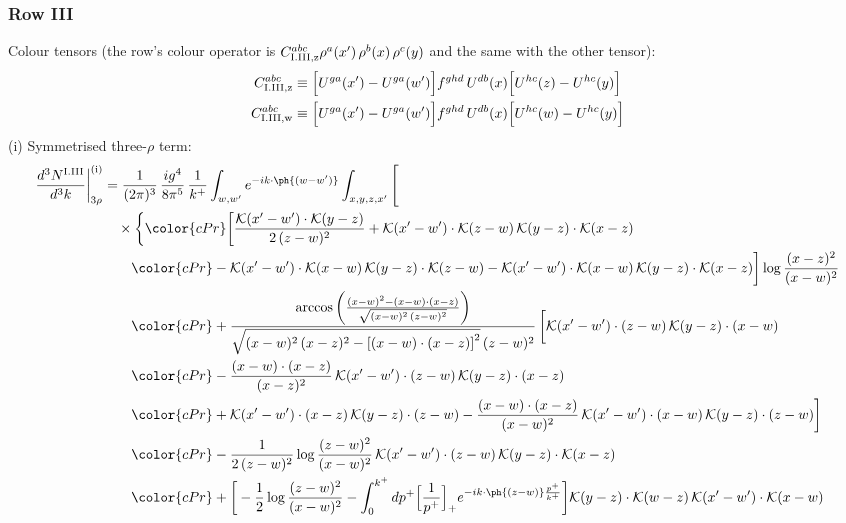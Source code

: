 \subsubsection*{Row III}
Colour tensors (the row's colour operator is $C^{abc}_{{\rm I.III,z}}\rho^{a}(x')\,\rho^{b}(x)\,\rho^{c}(y)$ and the same with the other tensor):
\begin{align}
C^{abc}_{{\rm I.III,z}}&\equiv \Big[U^{ga}(x')-U^{ga}(w')\Big]f^{ghd}\,U^{db}(x)\Big[U^{hc}(z)-U^{hc}(y)\Big]\notag\\
C^{abc}_{{\rm I.III,w}}&\equiv \Big[U^{ga}(x')-U^{ga}(w')\Big]f^{ghd}\,U^{db}(x)\Big[U^{hc}(w)-U^{hc}(y)\Big]\notag
\end{align}
(i) Symmetrised three-$\rho$ term:
\begin{align}
\frac{d^{3}N^{\rm I.III}}{d^{3}k}\bigg|^{\rm (i)}_{3\rho}&=\frac{1}{(2\pi)^{3}}\,\frac{ig^{4}}{8\pi^{5}}\,\frac{1}{k^{+}}\int_{w,w'}e^{-ik\cdot\ph{(w-w')}}\int_{x,y,z,x'}\Bigg[\notag\\
&\quad\times\bigg\{{\color{cPr}\bigg[\frac{\mathcal{K}(x'-w')\cdot\mathcal{K}(y-z)}{2\,(z-w)^{2}}+\mathcal{K}(x'-w')\cdot\mathcal{K}(z-w)\,\mathcal{K}(y-z)\cdot\mathcal{K}(x-z)}\notag\\
&\qquad{\color{cPr}-\mathcal{K}(x'-w')\cdot\mathcal{K}(x-w)\,\mathcal{K}(y-z)\cdot\mathcal{K}(z-w)-\mathcal{K}(x'-w')\cdot\mathcal{K}(x-w)\,\mathcal{K}(y-z)\cdot\mathcal{K}(x-z)\bigg]\log\frac{(x-z)^{2}}{(x-w)^{2}}}\notag\\
&\qquad{\color{cPr}+\frac{\arccos\left(\frac{(x-w)^{2}-(x-w)\cdot (x-z)}{\sqrt{(x-w)^{2}\,(z-w)^{2}}}\right)}{\sqrt{(x-w)^{2}\,(x-z)^{2}-\left[(x-w)\cdot (x-z)\right]^{2}}\,(z-w)^{2}}\,\bigg[\mathcal{K}(x'-w')\cdot(z-w)\,\mathcal{K}(y-z)\cdot(x-w)}\notag\\
&\qquad{\color{cPr}-\frac{(x-w)\cdot(x-z)}{(x-z)^{2}}\,\mathcal{K}(x'-w')\cdot(z-w)\,\mathcal{K}(y-z)\cdot(x-z)}\notag\\
&\qquad{\color{cPr}+\mathcal{K}(x'-w')\cdot(x-z)\,\mathcal{K}(y-z)\cdot(z-w)-\frac{(x-w)\cdot(x-z)}{(x-w)^{2}}\,\mathcal{K}(x'-w')\cdot(x-w)\,\mathcal{K}(y-z)\cdot(z-w)\bigg]}\notag\\
&\qquad{\color{cPr}-\frac{1}{2\,(z-w)^{2}}\log\frac{(z-w)^{2}}{(x-w)^{2}}\,\mathcal{K}(x'-w')\cdot(z-w)\,\mathcal{K}(y-z)\cdot\mathcal{K}(x-z)}\notag\\
&\qquad{\color{cPr}+\bigg[-\frac{1}{2}\log\frac{(z-w)^{2}}{(x-w)^{2}}-\int_{0}^{k^{+}}dp^{+}\Big[\frac{1}{p^{+}}\Big]_{+}e^{-ik\cdot\ph{(z-w)}\frac{p^{+}}{k^{+}}}\bigg]\mathcal{K}(y-z)\cdot\mathcal{K}(w-z)\,\mathcal{K}(x'-w')\cdot\mathcal{K}(x-w)}\notag\\

\end{align}
